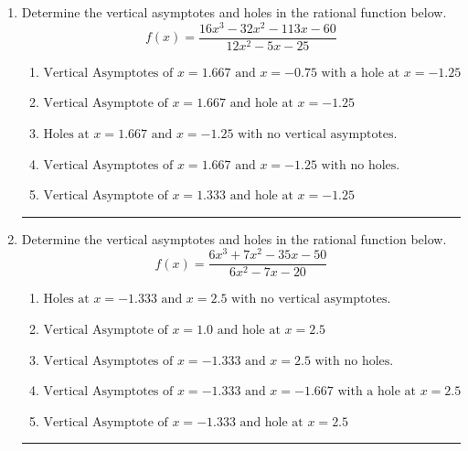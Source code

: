 \documentclass[14pt]{extbook}
\newcommand{\litem}[1]{\item#1\hspace*{-1cm}\rule{\textwidth}{0.4pt}}
\begin{document}
\begin{enumerate}
{\begin{enumerate}[label=\Alph*.]
\end{enumerate} }
\litem{
Determine the vertical asymptotes and holes in the rational function below.\[ f(x) = \frac{16x^{3} -32 x^{2} -113 x -60}{12x^{2} -5 x -25} \]\begin{enumerate}[label=\Alph*.]
\item \( \text{Vertical Asymptotes of } x = 1.667 \text{ and } x = -0.75 \text{ with a hole at } x = -1.25 \)
\item \( \text{Vertical Asymptote of } x = 1.667 \text{ and hole at } x = -1.25 \)
\item \( \text{Holes at } x = 1.667 \text{ and } x = -1.25 \text{ with no vertical asymptotes.} \)
\item \( \text{Vertical Asymptotes of } x = 1.667 \text{ and } x = -1.25 \text{ with no holes.} \)
\item \( \text{Vertical Asymptote of } x = 1.333 \text{ and hole at } x = -1.25 \)

\end{enumerate} }
\litem{
Determine the vertical asymptotes and holes in the rational function below.\[ f(x) = \frac{6x^{3} +7 x^{2} -35 x -50}{6x^{2} -7 x -20} \]\begin{enumerate}[label=\Alph*.]
\item \( \text{Holes at } x = -1.333 \text{ and } x = 2.5 \text{ with no vertical asymptotes.} \)
\item \( \text{Vertical Asymptote of } x = 1.0 \text{ and hole at } x = 2.5 \)
\item \( \text{Vertical Asymptotes of } x = -1.333 \text{ and } x = 2.5 \text{ with no holes.} \)
\item \( \text{Vertical Asymptotes of } x = -1.333 \text{ and } x = -1.667 \text{ with a hole at } x = 2.5 \)
\item \( \text{Vertical Asymptote of } x = -1.333 \text{ and hole at } x = 2.5 \)

\end{enumerate} }
\end{enumerate}
\end{document}
